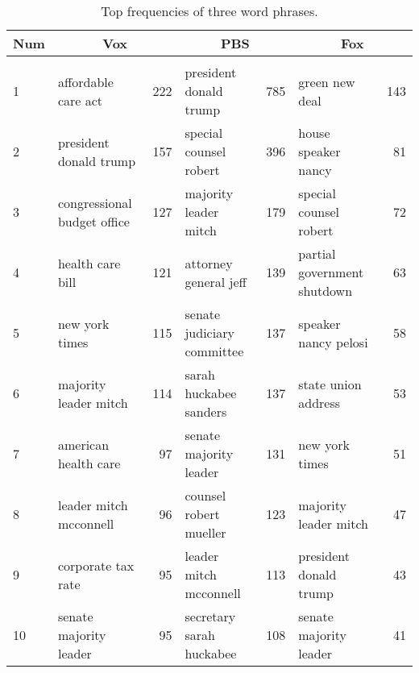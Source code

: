 \begin{landscape}
	\centering
	\begin{table}[H]
	    \caption{Top frequencies of three word phrases.}
	    \label{tab:3gram}
	    \begin{tabular}{l|lr|lr|lr}
	    \hline
	    \textbf{Num} & \multicolumn{2}{c|}{\textbf{Vox}}          & \multicolumn{2}{c|}{\textbf{PBS}}         & \multicolumn{2}{c}{Fox}          \\ \hline \hline
	    &&&&&& \\
	    1   & affordable care act         & 222 & president donald trump     & 785 & green new deal              & 143 \\ 
	    2   & president donald trump      & 157 & special counsel robert     & 396 & house speaker nancy         & 81  \\ 
	    3   & congressional budget office & 127 & majority leader mitch      & 179 & special counsel robert      & 72  \\
	    4   & health care bill            & 121 & attorney general jeff      & 139 & partial government shutdown & 63  \\
	    5   & new york times              & 115 & senate judiciary committee & 137 & speaker nancy pelosi        & 58  \\
	    6   & majority leader mitch       & 114 & sarah huckabee sanders     & 137 & state union address         & 53  \\
	    7   & american health care        & 97  & senate majority leader     & 131 & new york times              & 51  \\
	    8   & leader mitch mcconnell      & 96  & counsel robert mueller     & 123 & majority leader mitch       & 47  \\
	    9   & corporate tax rate          & 95  & leader mitch mcconnell     & 113 & president donald trump      & 43  \\
	    10  & senate majority leader      & 95  & secretary sarah huckabee   & 108 & senate majority leader      & 41  \\ \hline
	    \end{tabular}
	\end{table}
\end{landscape}